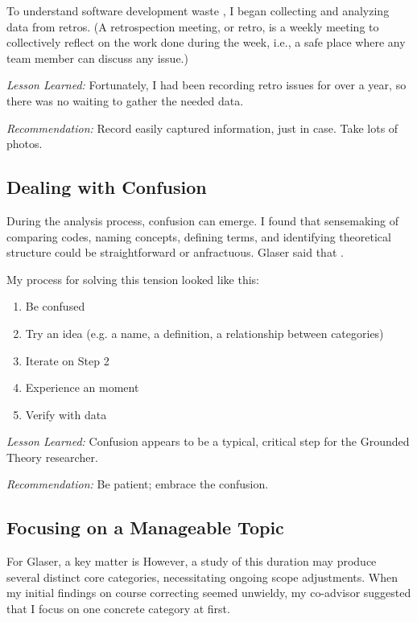 To understand software development waste \cite{SedanoSoftwareDevelopmentWaste}, I  began collecting and analyzing data from retros. (A retrospection meeting, or retro, is a weekly meeting to collectively reflect on the work done during the week, i.e., a safe place where any team member can discuss any issue.) 

\textit{Lesson Learned:} Fortunately, I had been recording retro issues for over a year, so there was no waiting to gather the needed data. 

\textit{Recommendation:} Record easily captured information, just in case. Take lots of photos.
\subsection{Dealing with Confusion}
During the analysis process, confusion can emerge. I found that sensemaking of comparing codes, naming concepts, defining terms, and identifying theoretical structure could be straightforward or anfractuous. Glaser said that  \cite{GlaserMillValleyWorkshop}. 

My process for solving this tension looked like this:

\begin{enumerate}
  \item Be confused
  \item Try an idea (e.g. a name, a definition, a relationship between categories)
  \item Iterate on Step 2
  \item Experience an  moment
  \item Verify with data
\end{enumerate}

\textit{Lesson Learned:} Confusion appears to be a typical, critical step for the Grounded Theory researcher.

\textit{Recommendation:} Be patient; embrace the confusion.
\subsection{Focusing on a Manageable Topic}
For Glaser, a key matter is  However, a study of this duration may produce several distinct core categories, necessitating ongoing scope adjustments. When my initial findings on course correcting seemed unwieldy, my co-advisor suggested that I focus on one concrete category at first. 

